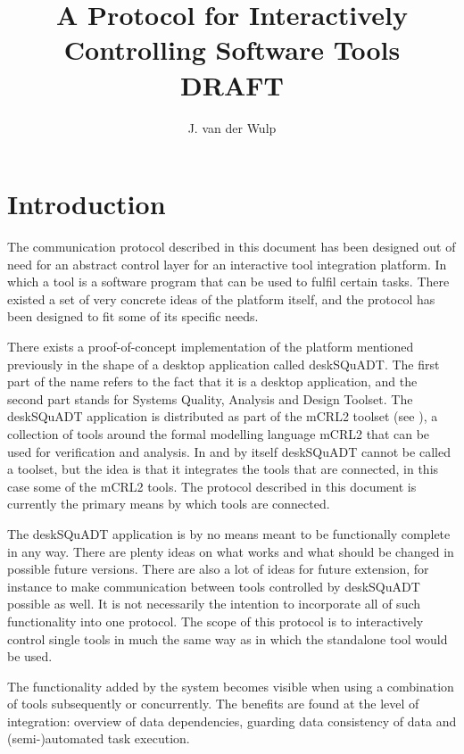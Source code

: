 \documentclass{article}
\title{A Protocol for Interactively Controlling Software Tools\\DRAFT}
\author{J. van der Wulp}
\begin{document}
\maketitle

 \section{Introduction}

  The communication protocol described in this document has been designed out
  of need for an abstract control layer for an interactive tool integration
  platform. In which a tool is a software program that can be used to fulfil
  certain tasks. There existed a set of very concrete ideas of the platform
  itself, and the protocol has been designed to fit some of its specific needs.

  There exists a proof-of-concept implementation of the platform mentioned
  previously in the shape of a desktop application called deskSQuADT. The first
  part of the name refers to the fact that it is a desktop application, and the
  second part stands for Systems Quality, Analysis and Design Toolset.  The
  deskSQuADT application is distributed as part of the mCRL2 toolset (see
  \cite{groote_et_al:DSP:2007:862}), a collection of tools around the formal
  modelling language mCRL2 that can be used for verification and analysis.  In
  and by itself deskSQuADT cannot be called a toolset, but the idea is that it
  integrates the tools that are connected, in this case some of the mCRL2
  tools.   The protocol described in this document is currently the primary
  means by which tools are connected.

  The deskSQuADT application is by no means meant to be functionally complete
  in any way. There are plenty ideas on what works and what should be changed
  in possible future versions.  There are also a lot of ideas for future
  extension, for instance to make communication between tools controlled by
  deskSQuADT possible as well.  It is not necessarily the intention to
  incorporate all of such functionality into one protocol. The scope of this
  protocol is to interactively control single tools in much the same way as in
  which the standalone tool would be used.
  
  The functionality added by the system becomes visible when using a
  combination of tools subsequently or concurrently. The benefits are found at
  the level of integration: overview of data dependencies, guarding data
  consistency of data and (semi-)automated task execution.
\end{document}
